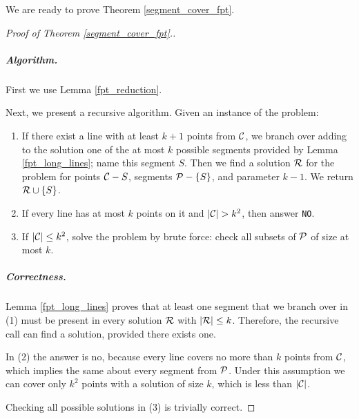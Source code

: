 We are ready to prove Theorem \ref{segment_cover_fpt}.

\begin{proof}[Proof of Theorem \ref{segment_cover_fpt}.]\leavevmode



\subparagraph{Algorithm.}
First we use Lemma \ref{fpt_reduction}.

Next, we present a recursive algorithm. Given an instance of the problem:

\begin{enumerate}[label={(\arabic*)}]
\item If there exist a line with at least $k+1$ points from $\mathcal{C}$, we branch over
adding to the solution one of the at most $k$ possible segments
provided by Lemma \ref{fpt_long_lines}; name this segment $S$.
Then we find a solution $\mathcal{R}$
for the problem for points $\mathcal{C} - S$, segments $\mathcal{P} - \{S\}$,
and parameter $k-1$. We return $\mathcal{R} \cup \{S\}$.
\item If every line has at most $k$ points on it and $|\mathcal{C}| > k^2$,
then answer \texttt{NO}.
\item If $|\mathcal{C}| \le k^2$, solve the problem by brute force:
check all subsets of $\mathcal{P}$ of size at most $k$.
\end{enumerate}

\subparagraph{Correctness.}

Lemma \ref{fpt_long_lines} proves that at least one segment that we
branch over in (1) must be present in every solution $\mathcal{R}$ with $|\mathcal{R}| \le k$.
Therefore, the recursive call can find a solution, provided there exists one.

In (2) the answer is no, because every line covers no more than $k$ points
from $\mathcal{C}$, which implies the same about every segment from $\mathcal{P}$.
Under this assumption
we can cover only $k^2$ points with a solution of size $k$, which is less
than $|\mathcal{C}|$.

Checking all possible solutions in (3) is trivially correct.



\end{proof}
